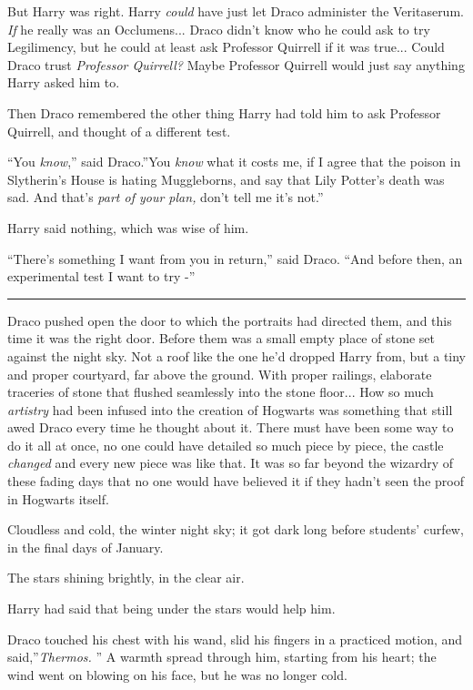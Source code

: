But Harry was right. Harry \emph{could} have just let Draco administer
the Veritaserum. \emph{If} he really was an Occlumens... Draco
didn't know who he could ask to try Legilimency, but he could at least
ask Professor Quirrell if it was true... Could Draco trust
\emph{Professor Quirrell?} Maybe Professor Quirrell would just say
anything Harry asked him to.

Then Draco remembered the other thing Harry had told him to ask
Professor Quirrell, and thought of a different test.

``You \emph{know},'' said Draco.''You \emph{know} what it costs me, if I
agree that the poison in Slytherin's House is hating Muggleborns, and
say that Lily Potter's death was sad. And that's \emph{part of your
plan,} don't tell me it's not.''

Harry said nothing, which was wise of him.

``There's something I want from you in return,'' said Draco. ``And
before then, an experimental test I want to try -''

\begin{center}\rule{3in}{0.4pt}\end{center}

Draco pushed open the door to which the portraits had directed them, and
this time it was the right door. Before them was a small empty place of
stone set against the night sky. Not a roof like the one he'd dropped
Harry from, but a tiny and proper courtyard, far above the ground. With
proper railings, elaborate traceries of stone that flushed seamlessly
into the stone floor... How so much \emph{artistry} had been
infused into the creation of Hogwarts was something that still awed
Draco every time he thought about it. There must have been some way to
do it all at once, no one could have detailed so much piece by piece,
the castle \emph{changed} and every new piece was like that. It was so
far beyond the wizardry of these fading days that no one would have
believed it if they hadn't seen the proof in Hogwarts itself.

Cloudless and cold, the winter night sky; it got dark long before
students' curfew, in the final days of January.

The stars shining brightly, in the clear air.

Harry had said that being under the stars would help him.

Draco touched his chest with his wand, slid his fingers in a practiced
motion, and said,''\emph{Thermos.} '' A warmth spread through him,
starting from his heart; the wind went on blowing on his face, but he
was no longer cold.

